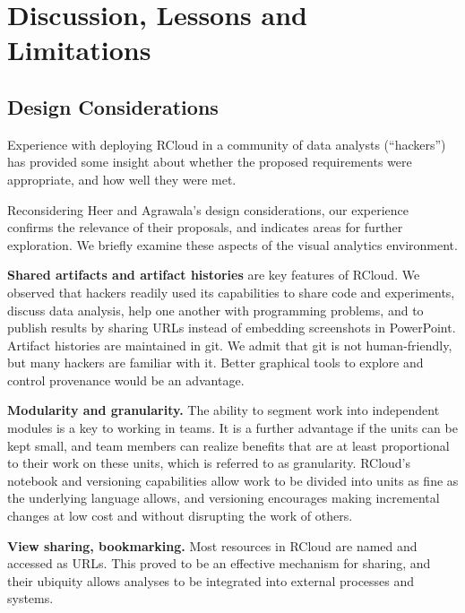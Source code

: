 \section{Discussion, Lessons and Limitations}
\label{sec:limitations}

\subsection{Design Considerations}


Experience with deploying RCloud in a community of data analysts
(``hackers'') has provided some insight about whether the proposed
requirements were appropriate, and how well they were met.

Reconsidering Heer and Agrawala's design considerations, our
experience confirms the relevance of their proposals, and indicates
areas for further exploration. We briefly examine these aspects of
the visual analytics environment.

{\bf Shared artifacts and artifact histories} are key features
of RCloud. We observed that hackers readily used its capabilities
to share code and experiments, discuss data analysis, help one another
with programming problems, and to publish results by sharing URLs
instead of embedding screenshots in PowerPoint. Artifact histories are
maintained in git. We admit that git is not human-friendly, but many
hackers are familiar with it. Better graphical tools to explore and
control provenance would be an advantage.

{\bf Modularity and granularity.} The ability to segment work into
independent modules is a key to working in teams. It is a further
advantage if the units can be kept small, and team members can
realize benefits that are at least proportional to their work
on these units, which is referred to as granularity. RCloud's notebook
and versioning capabilities allow work to be divided into units as fine
as the underlying language allows, and versioning encourages making
incremental changes at low cost and without disrupting the work of others.

{\bf View sharing, bookmarking.} Most resources in RCloud are named
and accessed as URLs. This proved to be an effective mechanism for
sharing, and their ubiquity allows analyses to be integrated into
external processes and systems.

